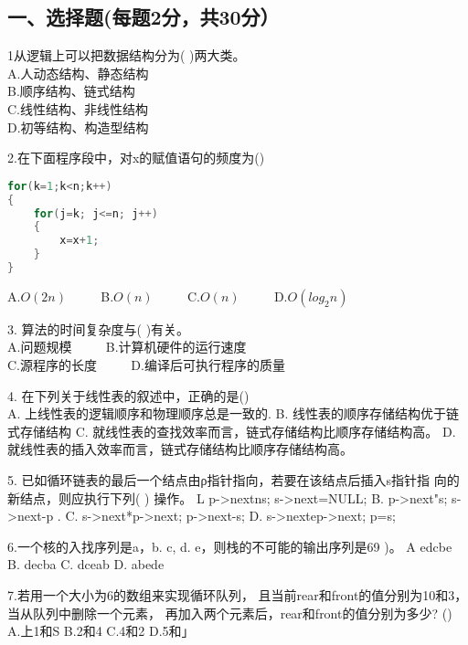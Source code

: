 

\subsection{一、选择题(每题2分，共30分）}
1从逻辑上可以把数据结构分为( )两大类。 \\
A.人动态结构、静态结构 \\
B.顺序结构、链式结构 \\
C.线性结构、非线性结构 \\
D.初等结构、构造型结构

2.在下面程序段中，对x的赋值语句的频度为() \\
\begin{lstlisting}[language=cpp]
for(k=1;k<n;k++)
{
    for(j=k; j<=n; j++)
    {
        x=x+1;
    }
}
\end{lstlisting}
A.$O(2n)$ $\qquad$ B.$O(n)$ $\qquad$ C.$O(n)$ $\qquad$ D.$O(log_2n)$

3. 算法的时间复杂度与(    )有关。 \\
A.问题规模 $\qquad$  B.计算机硬件的运行速度 \\
C.源程序的长度 $\qquad$ D.编译后可执行程序的质量

4. 在下列关于线性表的叙述中，正确的是() \\
A. 上线性表的逻辑顺序和物理顺序总是一致的.
B. 线性表的顺序存储结构优于链式存储结构
C. 就线性表的查找效率而言，链式存储结构比顺序存储结构高。
D. 就线性表的插入效率而言，链式存储结构比顺序存储结构高。

5. 已如循环链表的最后一个结点由ρ指针指向，若要在该结点后插入s指针指
向的新结点，则应执行下列( ) 操作。
L p->nextns; s->next=NULL;
B. p->next"s; s->next-p .
C. s->next*p->next; p->next-s;
D. s->nextep->next; p=s;

6.一个核的入找序列是a，b. c, d. e，则栈的不可能的输出序列是69 )。
A edcbe
B. decba
C. dceab
D. abede

7.若用一个大小为6的数组来实现循环队列， 且当前rear和front的值分别为10和3， 当从队列中删除一个元素， 再加入两个元素后，rear和front的值分别为多少? ()
A.上1和S
B.2和4
C.4和2
D.5和」